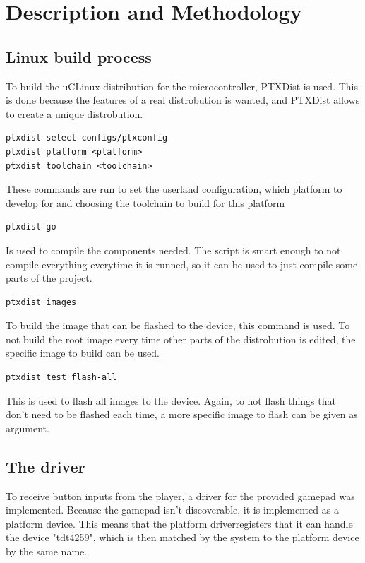 \section{Description and Methodology}

\subsection{Linux build process}
To build the uCLinux distribution for the microcontroller, PTXDist is
used\cite{ptxdistguru}. This is done because the features of a real
distrobution is wanted, and PTXDist allows to create a unique distrobution.

\begin{verbatim}
ptxdist select configs/ptxconfig
ptxdist platform <platform>
ptxdist toolchain <toolchain>
\end{verbatim}

\noindent
These commands are run to set the userland configuration, which platform to
develop for and choosing the toolchain to build for this platform

\begin{verbatim}
ptxdist go
\end{verbatim}

\noindent
Is used to compile the components needed. The script is smart enough to not
compile everything everytime it is runned, so it can be used to just compile
some parts of the project.

\begin{verbatim}
ptxdist images
\end{verbatim}

\noindent
To build the image that can be flashed to the device, this command is used. To
not build the root image every time other parts of the distrobution is edited,
the specific image to build can be used.

\begin{verbatim}
ptxdist test flash-all
\end{verbatim}

\noindent
This is used to flash all images to the device. Again, to not flash things that
don't need to be flashed each time, a more specific image to flash can be given
as argument.


\subsection{The driver}

To receive button inputs from the player, a driver for the provided gamepad was
implemented. Because the gamepad isn't discoverable, it is implemented as a
platform device. This means that the platform driver\footnotemark registers
that it can handle the device "tdt4259", which is then matched by the system to
the platform device by the same name.


